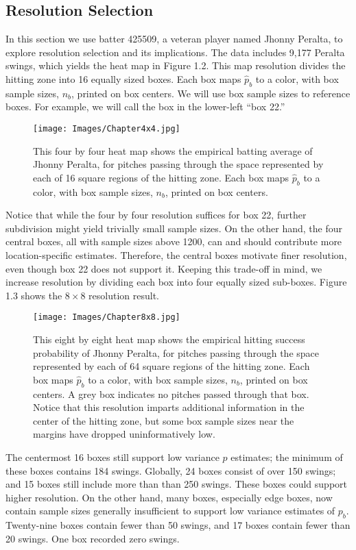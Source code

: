 \subsection{Resolution Selection}

In this section we use batter 425509, a veteran player named Jhonny Peralta, to explore resolution selection and its implications. The data includes 9,177 Peralta swings, which yields the heat map in Figure 1.2. This map resolution divides the hitting zone into 16 equally sized boxes. Each box maps $\hat{p}_{b}$ to a color, with box sample sizes, $n_{b}$, printed on box centers. We will use box sample sizes to reference boxes. For example, we will call the box in the lower-left ``box 22.'' 
        \begin{figure}[H]
      	\centering
      	\texttt{[image: Images/Chapter4x4.jpg]} 
      	\caption{This four by four heat map shows the empirical batting average of Jhonny Peralta, for pitches passing through the space represented by each of 16 square regions of the hitting zone. Each box maps $\hat{p}_{b}$ to a color, with box sample sizes, $n_{b}$, printed on box centers.}
      	\end{figure} 

Notice that while the four by four resolution suffices for box 22, further subdivision might yield trivially small sample sizes. On the other hand, the four central boxes, all with sample sizes above 1200, can and should contribute more location-specific estimates. Therefore, the central boxes motivate finer resolution, even though box 22 does not support it. Keeping this trade-off in mind, we increase resolution by dividing each box into four equally sized sub-boxes. Figure 1.3 shows the $8 \times 8$ resolution result.
        \begin{figure}[H]
      	\centering
      	\texttt{[image: Images/Chapter8x8.jpg]} 
      	\caption{This eight by eight heat map shows the empirical hitting success probability of Jhonny Peralta, for pitches passing through the space represented by each of 64 square regions of the hitting zone. Each box maps $\hat{p}_{b}$ to a color, with box sample sizes, $n_{b}$, printed on box centers. A grey box indicates no pitches passed through that box. Notice that this resolution imparts additional information in the center of the hitting zone, but some box sample sizes near the margins have dropped uninformatively low.}
      	\end{figure} 
The centermost 16 boxes still support low variance $p$ estimates; the minimum of these boxes contains 184 swings. Globally, 24 boxes consist of over 150 swings; and 15 boxes still include more than than 250 swings. These boxes could support higher resolution. On the other hand, many boxes, especially edge boxes, now contain sample sizes generally insufficient to support low variance estimates of $p_{b}$. Twenty-nine boxes contain fewer than 50 swings, and 17 boxes contain fewer than 20 swings. One box recorded zero swings.

